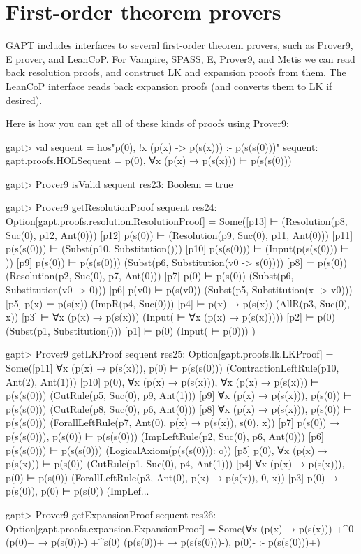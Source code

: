 \documentclass[a4paper,11pt]{book}
\begin{document}
\section{First-order theorem provers}\label{sec:fol_provers}

GAPT includes interfaces to several first-order theorem provers, such as
Prover9, E prover, and LeanCoP.  For Vampire, SPASS, E, Prover9, and Metis we can read back
resolution proofs, and construct LK and expansion proofs from them.  The
LeanCoP interface reads back expansion proofs (and converts them to LK if desired).

Here is how you can get all of these kinds of proofs using Prover9:
\begin{clilisting}
gapt> val sequent = hos"p(0), !x (p(x) -> p(s(x))) :- p(s(s(0)))"
sequent: gapt.proofs.HOLSequent = p(0), ∀x (p(x) → p(s(x))) ⊢ p(s(s(0)))

\end{clilisting}

\begin{clilisting}
gapt> Prover9 isValid sequent
res23: Boolean = true

gapt> Prover9 getResolutionProof sequent
res24: Option[gapt.proofs.resolution.ResolutionProof] =
Some([p13]  ⊢    (Resolution(p8, Suc(0), p12, Ant(0)))
[p12] p(s(0)) ⊢    (Resolution(p9, Suc(0), p11, Ant(0)))
[p11] p(s(s(0))) ⊢    (Subst(p10, Substitution()))
[p10] p(s(s(0))) ⊢    (Input(p(s(s(0))) ⊢ ))
[p9] p(s(0)) ⊢ p(s(s(0)))   (Subst(p6, Substitution(v0 -> s(0))))
[p8]  ⊢ p(s(0))   (Resolution(p2, Suc(0), p7, Ant(0)))
[p7] p(0) ⊢ p(s(0))   (Subst(p6, Substitution(v0 -> 0)))
[p6] p(v0) ⊢ p(s(v0))   (Subst(p5, Substitution(x -> v0)))
[p5] p(x) ⊢ p(s(x))   (ImpR(p4, Suc(0)))
[p4]  ⊢ p(x) → p(s(x))   (AllR(p3, Suc(0), x))
[p3]  ⊢ ∀x (p(x) → p(s(x)))   (Input( ⊢ ∀x (p(x) → p(s(x)))))
[p2]  ⊢ p(0)   (Subst(p1, Substitution()))
[p1]  ⊢ p(0)   (Input( ⊢ p(0)))
)

gapt> Prover9 getLKProof sequent
res25: Option[gapt.proofs.lk.LKProof] =
Some([p11] ∀x (p(x) → p(s(x))), p(0) ⊢ p(s(s(0)))    (ContractionLeftRule(p10, Ant(2), Ant(1)))
[p10] p(0), ∀x (p(x) → p(s(x))), ∀x (p(x) → p(s(x))) ⊢ p(s(s(0)))    (CutRule(p5, Suc(0), p9, Ant(1)))
[p9] ∀x (p(x) → p(s(x))), p(s(0)) ⊢ p(s(s(0)))    (CutRule(p8, Suc(0), p6, Ant(0)))
[p8] ∀x (p(x) → p(s(x))), p(s(0)) ⊢ p(s(s(0)))    (ForallLeftRule(p7, Ant(0), p(x) → p(s(x)), s(0), x))
[p7] p(s(0)) → p(s(s(0))), p(s(0)) ⊢ p(s(s(0)))    (ImpLeftRule(p2, Suc(0), p6, Ant(0)))
[p6] p(s(s(0))) ⊢ p(s(s(0)))    (LogicalAxiom(p(s(s(0))): o))
[p5] p(0), ∀x (p(x) → p(s(x))) ⊢ p(s(0))    (CutRule(p1, Suc(0), p4, Ant(1)))
[p4] ∀x (p(x) → p(s(x))), p(0) ⊢ p(s(0))    (ForallLeftRule(p3, Ant(0), p(x) → p(s(x)), 0, x))
[p3] p(0) → p(s(0)), p(0) ⊢ p(s(0))    (ImpLef...

gapt> Prover9 getExpansionProof sequent
res26: Option[gapt.proofs.expansion.ExpansionProof] =
Some(∀x (p(x) → p(s(x))) +^{0} (p(0)+ → p(s(0))-) +^{s(0)} (p(s(0))+ → p(s(s(0)))-),
p(0)-
:-
p(s(s(0)))+)

\end{clilisting}
\end{document}
